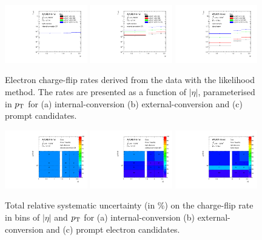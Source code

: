\begin{figure}[h!]
\centering
  {\includegraphics[width=0.32\textwidth]{figures/qmisid/crateData_tight_m0}}
  {\includegraphics[width=0.32\textwidth]{figures/qmisid/crateData_tight_m1}}
  {\includegraphics[width=0.32\textwidth]{figures/qmisid/crateData_tight_m2}}
  \caption{Electron charge-flip rates derived from the data with the likelihood method. The rates are presented 
           as a function of $|\eta|$, parameterised in $p_{\mathrm{T}}$ for (a) internal-conversion (b) external-conversion 
           and (c) prompt candidates.\label{fig:Lik2Ddata_main}}
\end{figure}

\begin{figure}[htp!] 
  \centering
  {\includegraphics[width=0.32\textwidth]{figures/qmisid/syst_Data_Total_tight_intcr}}
  {\includegraphics[width=0.32\textwidth]{figures/qmisid/syst_Data_Total_tight_extcr}}
  {\includegraphics[width=0.32\textwidth]{figures/qmisid/syst_Data_Total_tight_sr}}
  \caption{Total relative systematic uncertainty (in \%) on the charge-flip rate in bins of $|\eta|$ and 
           $p_{\mathrm{T}}$ for (a) internal-conversion (b) external-conversion and (c) prompt electron candidates.
           \label{fig:QMisID:systtight1} }
\end{figure}

